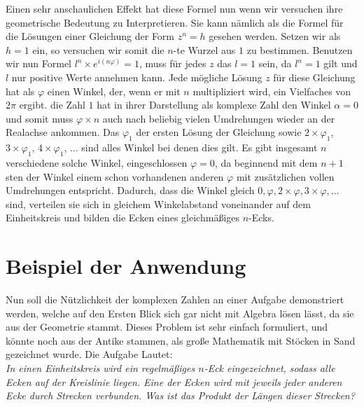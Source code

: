 \documentclass[a4paper,12pt]{article} %
\begin{document}
Einen sehr anschaulichen Effekt hat diese Formel nun wenn wir versuchen ihre geometrische Bedeutung zu Interpretieren. Sie kann nämlich als die Formel für die Lösungen einer Gleichung der Form $z^n=h$ gesehen werden. Setzen wir als $h=1$ ein, so versuchen wir somit  die $n$-te Wurzel aus $1$ zu bestimmen. Benutzen wir nun Formel $l^n \times e^{i(n\varphi)}=1$, muss für jedes $z$ das $l=1$ sein, da $l^n=1$ gilt und $l$ nur positive Werte annehmen kann. Jede mögliche Lösung $z$ für diese Gleichung hat als $\varphi$ einen Winkel, der, wenn er mit $n$ multipliziert wird, ein Vielfaches von $2\pi$ ergibt. die Zahl $1$ hat in ihrer Darstellung als komplexe Zahl den Winkel $\alpha=0$ und somit muss $\varphi\times n$ auch nach beliebig vielen Umdrehungen wieder an der Realachse ankommen. Das $\varphi_1$ der ersten Lösung der Gleichung sowie $2\times\varphi_1$, $3\times\varphi_1$, $4\times\varphi_1$, $\dots$ sind alles Winkel bei denen dies gilt. Es gibt insgesamt $n$ verschiedene solche Winkel, eingeschlossen $\varphi=0$, da beginnend mit dem $n+1$sten der Winkel einem schon vorhandenen anderen $\varphi$ mit zusätzlichen
vollen Umdrehungen entspricht.
Dadurch, dass die Winkel gleich $0, \varphi, 2\times \varphi, 3 \times \varphi, \dots$ sind, verteilen sie sich in gleichem Winkelabstand voneinander auf dem Einheitskreis und bilden die Ecken eines gleichmäßiges $n$-Ecks.













\section{Beispiel der Anwendung}

Nun soll die Nützlichkeit der komplexen Zahlen an einer Aufgabe demonstriert werden, welche auf den Ersten Blick sich gar nicht mit Algebra lösen lässt, da sie aus der Geometrie stammt. Dieses Problem ist sehr einfach formuliert, und könnte noch aus der Antike stammen, als große Mathematik mit Stöcken in Sand gezeichnet wurde. Die Aufgabe Lautet:\\

\noindent \textit{In einen Einheitskreis wird ein regelmäßiges $n$-Eck eingezeichnet, sodass alle Ecken auf der Kreislinie liegen.
Eine der Ecken wird mit jeweils jeder anderen Ecke durch Strecken verbunden.
Was ist das Produkt der Längen dieser Strecken?
}\\
\end{document}
